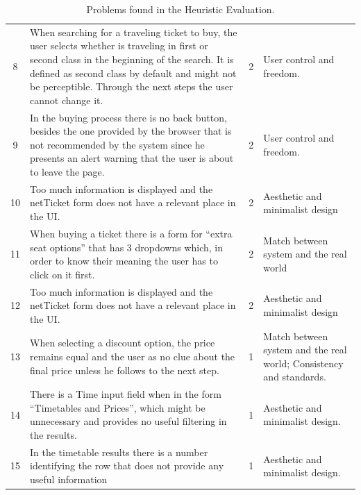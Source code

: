 \documentclass[a4paper]{article}
\begin{document}
\begin{table}[h]
\begin{center}
\begin{tabular}{c | p{8cm} | c | p{4.5cm} }
8 &  When searching for a traveling ticket to buy, the user selects whether is traveling in first or second class in the beginning of the search. It is defined as second class by default and might not be perceptible. Through the next steps the user cannot change it. & \cellcolor{orange!20} 2 & User control and freedom.\\

9 & In the buying process there is no back button, besides the one provided by the browser that is not recommended by the system since he presents an alert warning that the user is about to leave the page. & \cellcolor{orange!20}2 & User control and freedom. \\

10 & Too much information is displayed and the netTicket form does not have a relevant place in the UI. &  \cellcolor{orange!20}2 & Aesthetic and minimalist design\\

11 & When buying a ticket there is a form for ``extra seat options'' that has 3 dropdowns which, in order to know their meaning the user has to click on it first. &  \cellcolor{orange!20}2 & Match between system and the real world\\

12 & Too much information is displayed and the netTicket form does not have a relevant place in the UI. &  \cellcolor{orange!20}2 & Aesthetic and minimalist design\\

13  &  When selecting a discount option, the price remains equal and the user as no clue about the final price unless he follows to the next step. & \cellcolor{yellow!10} 1 &  Match between system and the real world; Consistency and standards. \\

	14  &  There is a Time input field when in the form ``Timetables and Prices'', which might be unnecessary and provides no useful filtering in the results.  & \cellcolor{yellow!10} 1 &  Aesthetic and minimalist design. \\
	
15 &  In the timetable results there is a number identifying the row that does not provide any useful information & \cellcolor{yellow!10} 1 & Aesthetic and minimalist design. \\
	
\hline
\end{tabular}
\end{center}
\caption{Problems found in the Heuristic Evaluation.}
\label{tab:heuristic_results}
\end{table}
\end{document}
